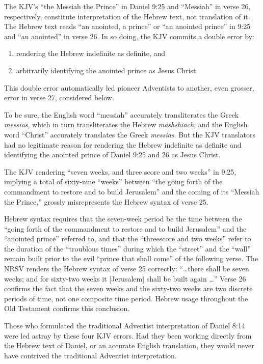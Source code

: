 The KJV's ``the Messiah the Prince'' in Daniel 9:25 and ``Messiah'' in verse 26,
respectively, constitute interpretation of the Hebrew text, not translation
of it. The Hebrew text reads ``an anointed, a prince'' or ``an anointed prince''
in 9:25 and ``an anointed'' in verse 26. In so doing, the KJV commits a double
error by: 
\begin{enumerate}
	\item rendering the Hebrew indefinite as definite, and 
	\item arbitrarily identifying the anointed prince as Jesus Christ.
\end{enumerate}
This double
error automatically led pioneer Adventists to another, even grosser, error
in verse 27, considered below.

To be sure, the English word ``messiah'' accurately transliterates the Greek
\textit{messias}, which in turn transliterates the Hebrew \textit{mashshiach}, and the English
word ``Christ'' accurately translates the Greek \textit{messias}. But the KJV
translators had no legitimate reason for rendering the Hebrew indefinite as 
definite and identifying the anointed prince of Daniel 9:25 and 26 as Jesus
Christ.

The KJV rendering ``seven weeks, and three score and two weeks'' in 9:25,
implying a total of sixty-nine ``weeks'' between ``the going forth of the
commandment to restore and to build Jerusalem'' and the coming of its
``Messiah the Prince,'' grossly misrepresents the Hebrew syntax of verse 25.

Hebrew syntax requires that the seven-week period be the time between the
``going forth of the commandment to restore and to build Jerusalem'' and the
``anointed prince'' referred to, and that the ``threescore and two weeks'' refer
to the duration of the ``troublous times'' during which the ``street'' and the
``wall'' remain built prior to the evil ``prince that shall come'' of the
following verse. The NRSV renders the Hebrew syntax of verse 25 correctly:
``\ldots there shall be seven weeks; and for sixty-two weeks it [Jerusalem]
shall be built again \ldots'' Verse 26 confirms the fact that the seven weeks
and the sixty-two weeks are two discrete periods of time, not one composite
time period. Hebrew usage throughout the Old Testament confirms this
conclusion.

Those who formulated the traditional Adventist interpretation of Daniel 8:14
were led astray by these four KJV errors. Had they been working directly
from the Hebrew text of Daniel, or an accurate English translation, they
would never have contrived the traditional Adventist interpretation.

